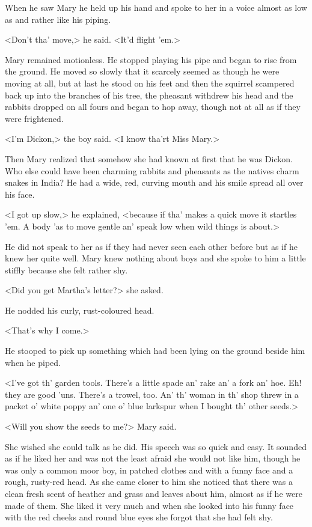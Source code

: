 When he saw Mary he held up his hand and spoke to her in a voice almost as low as and rather like his piping.

<Don't tha' move,> he said. <It'd flight 'em.>

Mary remained motionless. He stopped playing his pipe and began to rise from the ground. He moved so slowly that it scarcely seemed as though he were moving at all, but at last he stood on his feet and then the squirrel scampered back up into the branches of his tree, the pheasant withdrew his head and the rabbits dropped on all fours and began to hop away, though not at all as if they were frightened.

<I'm Dickon,> the boy said. <I know tha'rt Miss Mary.>

Then Mary realized that somehow she had known at first that he was Dickon. Who else could have been charming rabbits and pheasants as the natives charm snakes in India? He had a wide, red, curving mouth and his smile spread all over his face.

<I got up slow,> he explained, <because if tha' makes a quick move it startles 'em. A body 'as to move gentle an' speak low when wild things is about.>

He did not speak to her as if they had never seen each other before but as if he knew her quite well. Mary knew nothing about boys and she spoke to him a little stiffly because she felt rather shy.

<Did you get Martha's letter?> she asked.

He nodded his curly, rust-coloured head.

<That's why I come.>

He stooped to pick up something which had been lying on the ground beside him when he piped.

<I've got th' garden tools. There's a little spade an' rake an' a fork an' hoe. Eh! they are good 'uns. There's a trowel, too. An' th' woman in th' shop threw in a packet o' white poppy an' one o' blue larkspur when I bought th' other seeds.>

<Will you show the seeds to me?> Mary said.

She wished she could talk as he did. His speech was so quick and easy. It sounded as if he liked her and was not the least afraid she would not like him, though he was only a common moor boy, in patched clothes and with a funny face and a rough, rusty-red head. As she came closer to him she noticed that there was a clean fresh scent of heather and grass and leaves about him, almost as if he were made of them. She liked it very much and when she looked into his funny face with the red cheeks and round blue eyes she forgot that she had felt shy.

